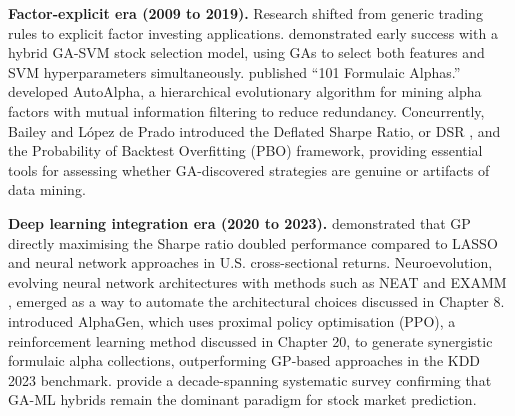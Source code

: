 \textbf{Factor-explicit era (2009 to 2019).} Research shifted from generic trading rules to explicit factor investing applications. \cite{Huang2012} demonstrated early success with a hybrid GA-SVM stock selection model, using GAs to select both features and SVM hyperparameters simultaneously. \cite{Kakushadze2016} published ``101 Formulaic Alphas.'' \cite{ZhangT2020} developed AutoAlpha, a hierarchical evolutionary algorithm for mining alpha factors with mutual information filtering to reduce redundancy. Concurrently, Bailey and López de Prado introduced the Deflated Sharpe Ratio, or DSR \citep{bailey2014deflated}, and \cite{bailey2017probability} the Probability of Backtest Overfitting (PBO) framework, providing essential tools for assessing whether GA-discovered strategies are genuine or artifacts of data mining.

\textbf{Deep learning integration era (2020 to 2023).} \cite{Liu2020} demonstrated that GP directly maximising the Sharpe ratio doubled performance compared to LASSO and neural network approaches in U.S. cross-sectional returns. Neuroevolution, evolving neural network architectures with methods such as NEAT \citep{Stanley2002} and EXAMM \citep{Lyu2024}, emerged as a way to automate the architectural choices discussed in Chapter 8. \cite{Yu2023} introduced AlphaGen, which uses proximal policy optimisation (PPO), a reinforcement learning method discussed in Chapter 20, to generate synergistic formulaic alpha collections, outperforming GP-based approaches in the KDD 2023 benchmark. \cite{Olorunda2024} provide a decade-spanning systematic survey confirming that GA-ML hybrids remain the dominant paradigm for stock market prediction.

